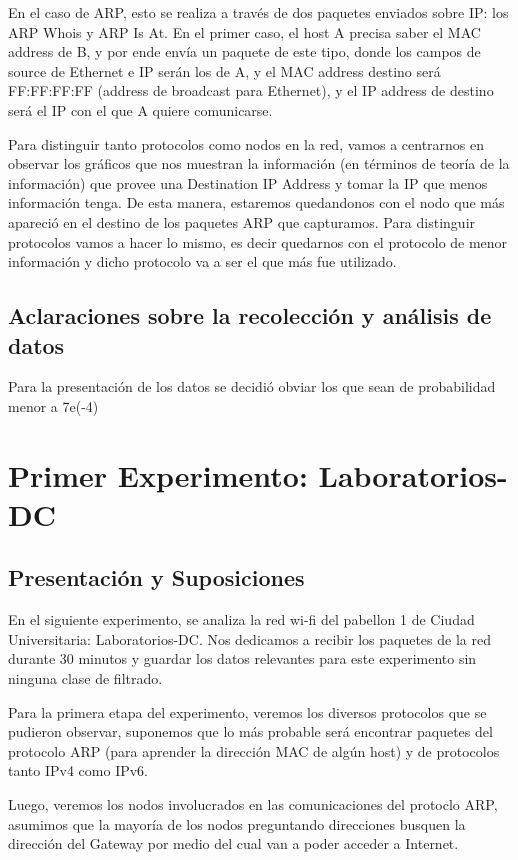 \documentclass{article}
\theoremstyle{definition}
\theoremstyle{remark}
\begin{document}
En el caso de ARP, esto se realiza a través de dos paquetes enviados sobre IP: los ARP Whois y ARP Is At. En el primer caso, el host A precisa saber el MAC address de B, y por ende envía un paquete de este tipo, donde los campos de source de Ethernet e IP serán los de A, y el MAC address destino será FF:FF:FF:FF (address de broadcast para Ethernet), y el IP address de destino será el IP con el que A quiere comunicarse. 

Para distinguir tanto protocolos como nodos en la red, vamos a centrarnos en observar los gráficos que nos muestran la información (en términos de teoría de la información) que provee una Destination IP Address y tomar la IP que menos información tenga. De esta manera, estaremos quedandonos con el nodo que más apareció en el destino de los paquetes ARP que capturamos. Para distinguir protocolos vamos a hacer lo mismo, es decir quedarnos con el protocolo de menor información y dicho protocolo va a ser el que más fue utilizado.

\subsection{Aclaraciones sobre la recolección y análisis de datos}
Para la presentación de los datos se decidió obviar los que sean de probabilidad menor a 7e(-4)


\newpage
\section{Primer Experimento: Laboratorios-DC}

\subsection{Presentación y Suposiciones}

En el siguiente experimento, se analiza la red wi-fi del pabellon 1 de Ciudad Universitaria: Laboratorios-DC. Nos dedicamos a recibir los paquetes de la red durante 30 minutos y guardar los datos relevantes para este experimento sin ninguna clase de filtrado.

Para la primera etapa del experimento, veremos los diversos protocolos que se pudieron observar, suponemos que lo más probable será encontrar paquetes del protocolo ARP (para aprender la dirección MAC de algún host) y de protocolos tanto IPv4 como IPv6.

Luego, veremos los nodos involucrados en las comunicaciones del protoclo ARP, asumimos que la mayoría de los nodos preguntando direcciones busquen la dirección del Gateway por medio del cual van a poder acceder a Internet.
\end{document}
